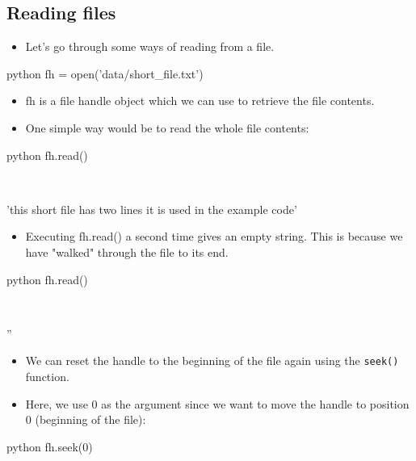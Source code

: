 \documentclass[aspectratio=1610,slidestop]{beamer}
\begin{document}
\subsection{Reading files}
\begin{pframe}
 \begin{itemize}
  \item Let's go through some ways of reading from a file.
 \end{itemize}
 \begin{ipython}
  \begin{pythonin}{python}
fh = open('data/short_file.txt')
  \end{pythonin}
 \end{ipython}

 \begin{itemize}
  \item fh is a file handle object which we can use to retrieve the file
  contents.
  \item One simple way would be to read the whole file contents:
 \end{itemize}
 \begin{ipython}
  \begin{pythonin}{python}
fh.read()
  \end{pythonin}
  \\
  \begin{pythonout}
'this short file has two lines it is used in the example code'
  \end{pythonout}
 \end{ipython}
\end{pframe}

\begin{pframe}
 \begin{itemize}
  \item Executing fh.read() a second time gives an empty string.
  This is because we have "walked" through the file to its end.
 \end{itemize}
 \vspace{-0.3cm}
 \begin{ipython}
  \begin{pythonin}{python}
fh.read()
  \end{pythonin}
  \\
  \begin{pythonout}
''
  \end{pythonout}
 \end{ipython}
 \begin{itemize}
  \item We can reset the handle to the beginning of the file again using the
  \texttt{seek()} function.
  \item Here, we use 0 as the argument since we want to move the handle to
  position 0 (beginning of the file):
 \end{itemize}
 \vspace{-0.3cm}
 \begin{ipython}
  \begin{pythonin}{python}
fh.seek(0)
  \end{pythonin}
 \end{ipython}
\end{pframe}
\end{document}
